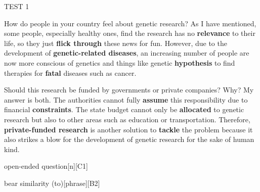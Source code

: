 \begin{glossarymc}[Cambridge 6]
\begin{test}{TEST 1}
    \begin{qa}{How do people in your country feel about genetic research?}
    As I have mentioned, some people, especially healthy ones, find the research has no \textbf{relevance} to their life, so they just \textbf{flick through} these news for fun. However, due to the development of \textbf{genetic-related diseases}, an increasing number of people are now more conscious of genetics and things like genetic \textbf{hypothesis} to find therapies for \textbf{fatal} diseases such as cancer.
    \end{qa}

    \begin{qa}{Should this research be funded by governments or private companies? Why?}
    My answer is both. The authorities cannot fully \textbf{assume} this responsibility due to financial \textbf{constraints}. The state budget cannot only be \textbf{allocated} to genetic research but also to other areas such as education or transportation. Therefore, \textbf{private-funded research} is another solution to \textbf{tackle} the problem because it also strikes a blow for the development of genetic research for the sake of human kind.
    \end{qa}

        \begin{VocabExplain}[Part 3]
            \begin{ExplainCard}{open-ended question}[n][C1]
            \end{ExplainCard}

            \begin{ExplainCard}{bear similarity (to)}[phrase][B2]
        \end{ExplainCard}


\end{VocabExplain}
\end{test}
\end{glossarymc}
